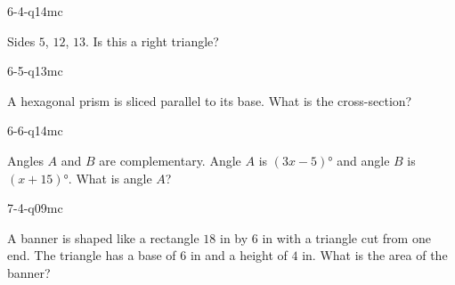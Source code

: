 \begin{practiceQuestion}{6-4-q14}{mc}
\begin{questionText}
Sides $5$, $12$, $13$. Is this a right triangle?
\end{questionText}
\end{practiceQuestion}

\begin{practiceQuestion}{6-5-q13}{mc}
\begin{questionText}
A hexagonal prism is sliced parallel to its base. What is the cross-section?
\end{questionText}
\end{practiceQuestion}

\begin{practiceQuestion}{6-6-q14}{mc}
\begin{questionText}
Angles $A$ and $B$ are complementary. Angle $A$ is $(3x - 5)°$ and angle $B$ is $(x + 15)°$. What is angle $A$?
\end{questionText}
\end{practiceQuestion}

\begin{practiceQuestion}{7-4-q09}{mc}
\begin{questionText}
A banner is shaped like a rectangle $18$ in by $6$ in with a triangle cut from one end. The triangle has a base of $6$ in and a height of $4$ in. What is the area of the banner?
\end{questionText}
\end{practiceQuestion}


